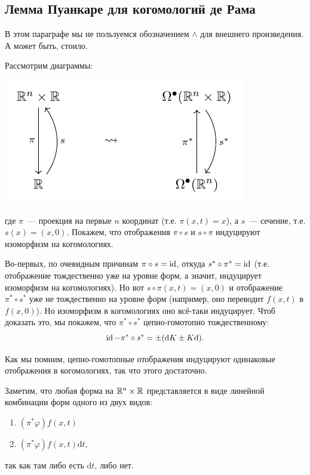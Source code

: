 \subsection{Лемма Пуанкаре для когомологий де Рама}

 	\begin{remark}
 		В этом параграфе мы не пользуемся обозначением $\wedge$ для внешнего произведения. А может быть, стоило. 
 	\end{remark}

 		Рассмотрим диаграммы: 

 		\begin{center}
 			\includegraphics{lectures/7/pictures/cd_12.pdf}
 		\end{center}

 		где $\pi$~--- проекция на первые $n$ координат (т.е. $\pi(x, t) = x$), а $s$~--- сечение, т.е. $s(x) = (x, 0)$. Покажем, что отображения $\pi \circ s$ и $s \circ \pi$ индуцируют изоморфизм на когомологиях. 

 		Во-первых, по очевидным причинам $\pi \circ s = \operatorname{id}$, откуда $s^* \circ \pi^* = \operatorname{id}$ (т.е. отображение тождественно уже на уровне форм, а значит, индуцирует изоморфизм на когомологиях). Но вот $s \circ \pi(x, t) = (x, 0)$ и отображение $\pi^* \circ s^*$ уже не тождественно на уровне форм (например, оно переводит $f(x, t)$ в $f(x, 0)$). Но изоморфизм в когомологиях оно всё-таки индуцирует. Чтоб доказать это, мы покажем, что $\pi^* \circ s^*$ цепно-гомотопно тождественному:
 		\[
 		 	\operatorname{id} - \pi^* \circ s^* = \pm (\mathrm{d}K \pm K\mathrm{d}).
 		 \] 

 		 Как мы помним, цепно-гомотопные отображения индуцируют одинаковые отображения в когомологиях, так что этого достаточно. 

 		 Заметим, что любая форма на $\mathbb{R}^n \times \mathbb{R}$ представляется в виде линейной комбинации форм одного из двух видов: 
 		 \begin{enumerate}
 		 	\item $(\pi^* \varphi) f(x, t)$
 		 	\item $(\pi^*\varphi) f(x, t) \mathrm{d}t$,
 		 \end{enumerate}
 		 так как там либо есть $\mathrm{d}t$, либо нет. 

